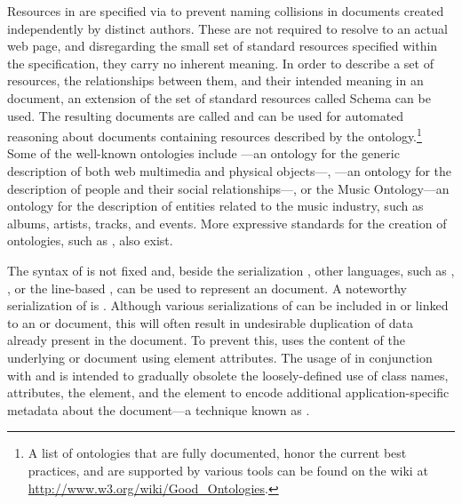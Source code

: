 Resources in  are specified via  to prevent naming
collisions in  documents created independently by distinct authors.
These  are not required to resolve to an actual web page, and
disregarding the small set of standard resources specified within the
 specification, they carry no inherent meaning. In order to
describe a set of resources, the relationships between them, and their intended
meaning in an  document, an extension of the set of standard
resources called  Schema \cite{brickley04} can be used. The
resulting documents are called 
 and can be used for automated reasoning about
 documents containing resources described by the
ontology.\footnote{
  A list of ontologies that are fully documented, honor the current best
  practices, and are supported by various tools can be found on the
   wiki at \url{http://www.w3.org/wiki/Good_Ontologies}.
} Some of the well-known ontologies include ---an ontology for the
generic description of both web multimedia and physical objects---,
---an ontology for the description of people and their social
relationships---, or the Music Ontology---an ontology for the description of
entities related to the music industry, such as albums, artists, tracks, and
events. More expressive standards for the creation of ontologies, such as
, also exist.

The syntax of  is not fixed and, beside the 
serialization \cite{lassira99}, other languages, such as ,
 \cite{beckett14:turtle}, or the line-based 
\cite{beckett14:nt}, can be used to represent an  document. A
noteworthy serialization of  is .  Although various
serializations of  can be included in or linked to an
 or  document, this will often result in
undesirable duplication of data already present in the document. To prevent
this,  uses the content of the underlying  or
 document using element attributes. The usage of 
in conjunction with  and  is intended to gradually
obsolete the loosely-defined use of  class names, attributes, the
 element, and the  element to encode additional
application-specific metadata about the document---a technique known as
.

